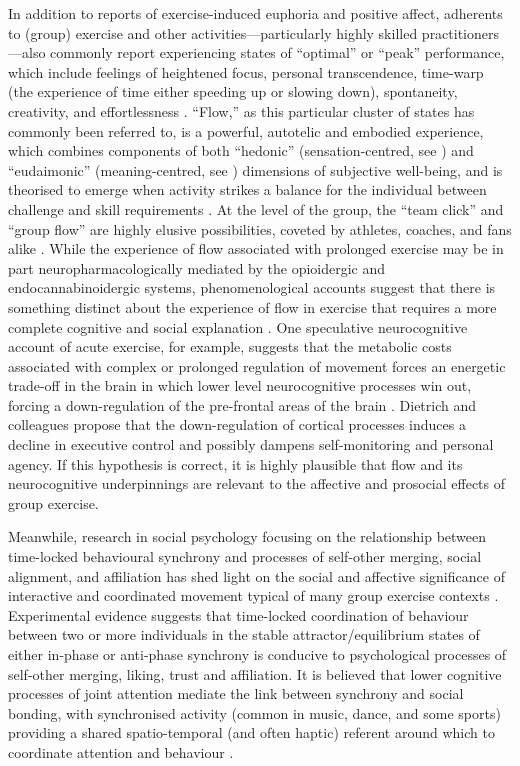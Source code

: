 In addition to reports of exercise-induced euphoria and positive affect, adherents to (group) exercise and other activities---particularly highly skilled practitioners---also commonly report experiencing states of ``optimal'' or ``peak'' performance, which include feelings of heightened focus, personal transcendence, time-warp (the experience of time either speeding up or slowing down), spontaneity, creativity, and effortlessness \citep{Jackson1995a}.  ``Flow,'' as this particular cluster of states has commonly been referred to, is a powerful, autotelic and embodied experience, which combines components of both ``hedonic'' (sensation-centred, see \citep{Huta2010}) and ``eudaimonic'' (meaning-centred, see \cite{Ryff1989,Ryff2015}) dimensions of subjective well-being, and is theorised to emerge when activity strikes a balance for the individual between challenge and skill requirements \citep{Csikszentmihalyi1990,Abuhamdeh2012}.  At the level of the group, the ``team click'' and ``group flow'' are highly elusive possibilities, coveted by athletes, coaches, and fans alike \citep{Novak1993,Sawyer2006}.  While the experience of flow associated with prolonged exercise may be in part neuropharmacologically mediated by the opioidergic and endocannabinoidergic systems, phenomenological accounts suggest that there is something distinct about the experience of flow in exercise that requires a more complete cognitive and social explanation \citep{Dietrich2006,Dietrich2011}.  One speculative neurocognitive account of acute exercise, for example, suggests that the metabolic costs associated with complex or prolonged regulation of movement forces an energetic trade-off in the brain in which lower level neurocognitive processes win out, forcing a down-regulation of the pre-frontal areas of the brain \citep{Dietrich2011}. Dietrich and colleagues propose that the down-regulation of cortical processes induces a decline in executive control \citep{Labelle2013} and possibly dampens self-monitoring and personal agency. If this hypothesis is correct, it is highly plausible that flow and its neurocognitive underpinnings are relevant to the affective and prosocial effects of group exercise.

Meanwhile, research in social psychology focusing on the relationship between time-locked behavioural synchrony and processes of self-other merging, social alignment, and affiliation has shed light on the social and affective significance of interactive and coordinated movement typical of many group exercise contexts \cite{Wiltermuth2009,Kirschner2010,Reddish2013,Tuncgenc2016}. Experimental evidence suggests that time-locked coordination of behaviour between two or more individuals in the stable attractor/equilibrium states of either in-phase or anti-phase synchrony is conducive to psychological processes of self-other merging, liking, trust and affiliation.  It is believed that lower cognitive processes of joint attention mediate the link between synchrony and social bonding, with synchronised activity (common in music, dance, and some sports) providing a shared spatio-temporal (and often haptic) referent around which to coordinate attention and behaviour \cite{Launay2016,Wolf2015}.

